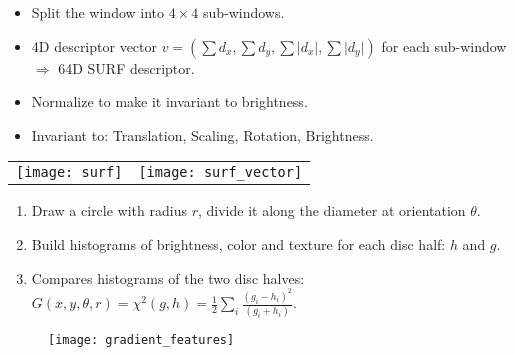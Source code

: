 \documentclass[11pt, a4paper, landscape]{article}
\begin{document}
\NewPage{}
\vfill
\begin{itemize}
\item Split the window into $4 \times 4$ sub-windows.
\item 4D descriptor vector $v = (\sum d_x, \sum d_y, \sum \lvert d_x \rvert, \sum \lvert d_y \rvert)$ for each sub-window\\
$\Rightarrow$ 64D SURF descriptor.
\item Normalize to make it invariant to brightness.
\item Invariant to: Translation, Scaling, Rotation, Brightness.
\end{itemize}
\begin{table}
  \centering
  \begin{tabular}{@{} M{.5\linewidth} M{.5\linewidth} @{}}
      \texttt{[image: surf]}
      &
      \texttt{[image: surf\_vector]}%
  \end{tabular}
\end{table}
\vfill





\NewPage{}
\small
\vfill
\begin{enumerate}
\item Draw a circle with radius $r$, divide it along the diameter at orientation $\theta$.
\item Build histograms of brightness, color and texture for each disc half: $h$ and $g$.
\item Compares histograms of the two disc halves: $G(x, y, \theta, r) = \chi ^ 2 (g, h) = \frac{1}{2} \sum_i \frac{(g_i - h_i)^2}{(g_i + h_i)}$.
\end{enumerate}
\begin{figure}
	\centering
	\texttt{[image: gradient\_features]}
\end{figure}
\vfill
\end{document}
